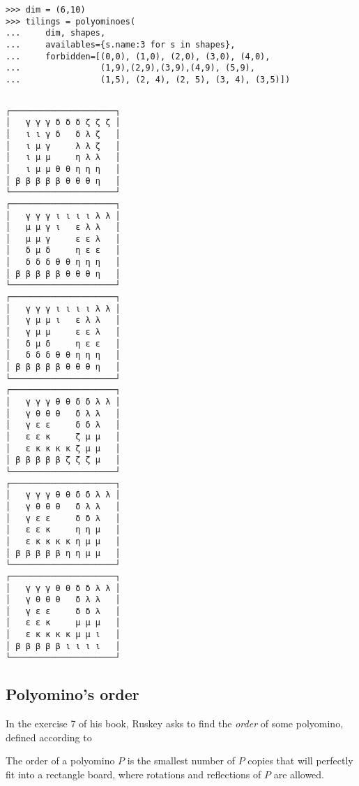 \begin{verbatim}
>>> dim = (6,10)
>>> tilings = polyominoes(
...     dim, shapes,
...     availables={s.name:3 for s in shapes},
...     forbidden=[(0,0), (1,0), (2,0), (3,0), (4,0),
...                (1,9),(2,9),(3,9),(4,9), (5,9),
...                (1,5), (2, 4), (2, 5), (3, 4), (3,5)])
\end{verbatim}

\begin{margintable}%
\inputminted[fontsize=\footnotesize,]{python}{backtracking/pentominoes-regular-snippet.py}
\begin{Verbatim}[baselinestretch=0.1, fontsize=\footnotesize]
┌─────────────────────┐
│   γ γ γ δ δ δ ζ ζ ζ │
│   ι ι γ δ   δ λ ζ   │
│   ι μ γ     λ λ ζ   │
│   ι μ μ     η λ λ   │
│   ι μ μ θ θ η η η   │
│ β β β β β θ θ θ η   │
└─────────────────────┘
┌─────────────────────┐
│   γ γ γ ι ι ι ι λ λ │
│   μ μ γ ι   ε λ λ   │
│   μ μ γ     ε ε λ   │
│   δ μ δ     η ε ε   │
│   δ δ δ θ θ η η η   │
│ β β β β β θ θ θ η   │
└─────────────────────┘
┌─────────────────────┐
│   γ γ γ ι ι ι ι λ λ │
│   γ μ μ ι   ε λ λ   │
│   γ μ μ     ε ε λ   │
│   δ μ δ     η ε ε   │
│   δ δ δ θ θ η η η   │
│ β β β β β θ θ θ η   │
└─────────────────────┘
┌─────────────────────┐
│   γ γ γ θ θ δ δ λ λ │
│   γ θ θ θ   δ λ λ   │
│   γ ε ε     δ δ λ   │
│   ε ε κ     ζ μ μ   │
│   ε κ κ κ κ ζ μ μ   │
│ β β β β β ζ ζ ζ μ   │
└─────────────────────┘
┌─────────────────────┐
│   γ γ γ θ θ δ δ λ λ │
│   γ θ θ θ   δ λ λ   │
│   γ ε ε     δ δ λ   │
│   ε ε κ     η η μ   │
│   ε κ κ κ κ η μ μ   │
│ β β β β β η η μ μ   │
└─────────────────────┘
┌─────────────────────┐
│   γ γ γ θ θ δ δ λ λ │
│   γ θ θ θ   δ λ λ   │
│   γ ε ε     δ δ λ   │
│   ε ε κ     μ μ μ   │
│   ε κ κ κ κ μ μ ι   │
│ β β β β β ι ι ι ι   │
└─────────────────────┘
\end{Verbatim}
\end{margintable}

\subsection{Polyomino's order}

In the exercise 7 of his book, Ruskey asks to find the \textit{order} of some
polyomino, defined according to

\begin{definition}
The order of a polyomino $P$ is the smallest number of $P$ copies that will
perfectly fit into a rectangle board, where rotations and reflections of $P$
are allowed.
\end{definition}

